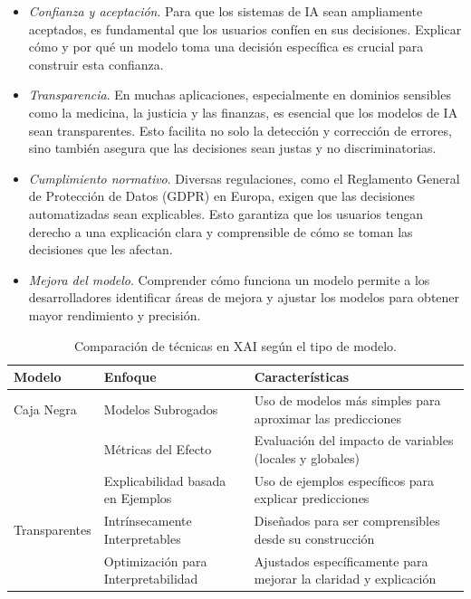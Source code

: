 \begin{itemize}
    \item \textit{Confianza y aceptación}. Para que los sistemas de IA sean ampliamente aceptados, es fundamental que los usuarios confíen en sus decisiones. Explicar cómo y por qué un modelo toma una decisión específica es crucial para construir esta confianza.
    
    \item \textit{Transparencia}. En muchas aplicaciones, especialmente en dominios sensibles como la medicina, la justicia y las finanzas, es esencial que los modelos de IA sean transparentes. Esto facilita no solo la detección y corrección de errores, sino también asegura que las decisiones sean justas y no discriminatorias.
    
    \item \textit{Cumplimiento normativo}. Diversas regulaciones, como el Reglamento General de Protección de Datos (GDPR) en Europa, exigen que las decisiones automatizadas sean explicables. Esto garantiza que los usuarios tengan derecho a una explicación clara y comprensible de cómo se toman las decisiones que les afectan.
    
    \item \textit{Mejora del modelo}. Comprender cómo funciona un modelo permite a los desarrolladores identificar áreas de mejora y ajustar los modelos para obtener mayor rendimiento y precisión.
\end{itemize}

\begin{table}[H]
    \centering
    \scriptsize %
    \renewcommand{\arraystretch}{1.5} %
    \begin{tabular}{p{3.5cm} p{5cm} p{5.8cm}}
        \toprule
        \textbf{Modelo} & \textbf{Enfoque} & \textbf{Características} \\
        \midrule
        Caja Negra & Modelos Subrogados & Uso de modelos más simples para aproximar las predicciones \\ 
        & Métricas del Efecto & Evaluación del impacto de variables (locales y globales) \\ 
        & Explicabilidad basada en Ejemplos & Uso de ejemplos específicos para explicar predicciones \\
        \midrule
        Transparentes & Intrínsecamente Interpretables & Diseñados para ser comprensibles desde su construcción \\
        & Optimización para Interpretabilidad & Ajustados específicamente para mejorar la claridad y explicación \\ 
        \bottomrule
    \end{tabular}
    \caption{Comparación de técnicas en XAI según el tipo de modelo.}
    \label{fig:cuadro-xai}
\end{table}

